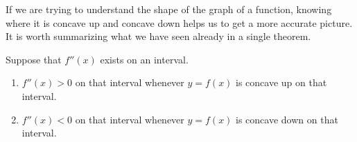\documentclass{ximera}
\begin{document}
If we are trying to understand the shape of the graph of a function,
knowing where it is concave up and concave down helps us to get a more
accurate picture. It is worth summarizing what we have seen already in a single theorem.

\begin{theorem}
Suppose that $f''(x)$ exists on an interval.
\begin{enumerate}
\item $f''(x)>0$ on that interval whenever $y=f(x)$ is concave up on that interval.
\item $f''(x)<0$ on that interval whenever $y=f(x)$ is concave down on that interval.
\end{enumerate}
\end{theorem}
\end{document}
